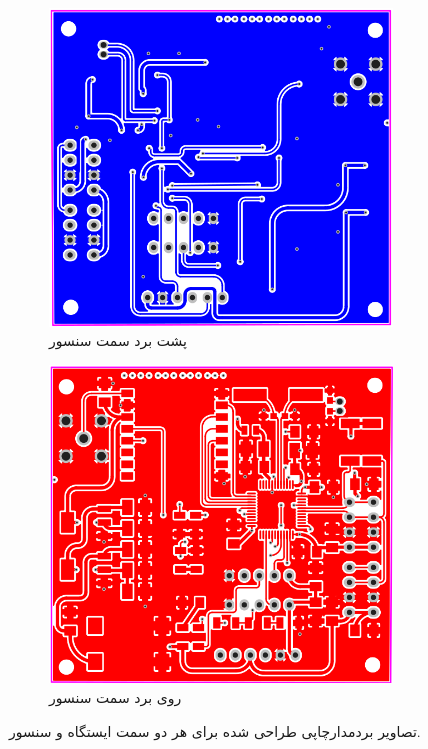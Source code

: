 \begin{figure}[!h]
\begin{subfigure}[b]{0.5\textwidth}
		\includegraphics[width=\linewidth]{Assets/transmitterBack.png}
		\caption{پشت برد سمت سنسور}
		\label{fig:}
	\end{subfigure}
	\begin{subfigure}[b]{0.5\textwidth}
		\includegraphics[width=\linewidth]{Assets/transmitterFront.png}
		\caption{روی برد سمت سنسور}
		\label{fig:}
	\end{subfigure}
	\caption{تصاویر بردمدارچاپی طراحی شده برای هر دو سمت ایستگاه و سنسور.}
\end{figure}
 




